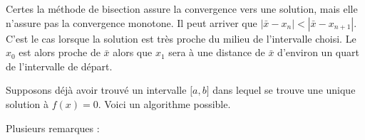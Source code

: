 \begin{normaltext}
	Certes la méthode de bisection assure la convergence vers une solution, mais elle n'assure pas la convergence monotone. Il peut arriver que \( | \bar x-x_n |<| \bar x-x_{n+1} |\). C'est le cas lorsque la solution est très proche du milieu de l'intervalle choisi. Le \( x_0\) est alors proche de \( \bar x\) alors que \( x_1\) sera à une distance de \( \bar x\) d'environ un quart de l'intervalle de départ.
\end{normaltext}

Supposons déjà avoir trouvé un intervalle \( \mathopen[ a , b \mathclose]\) dans lequel se trouve une unique solution à \( f(x)=0\). Voici un algorithme possible.



Plusieurs remarques :
